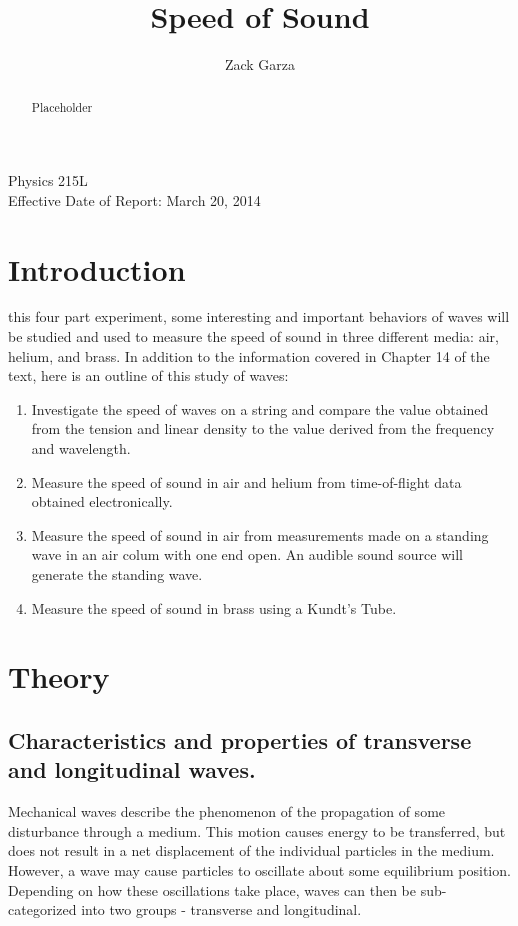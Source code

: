 \documentclass[twocolumn,english]{IEEEtran}
\theoremstyle{plain}
\theoremstyle{plain}
\begin{document}
\title{Speed of Sound}


\author{Zack Garza}


\IEEEspecialpapernotice
{Physics 215L \\
Effective Date of Report: March 20, 2014 }


\maketitle
\begin{abstract}
Placeholder
\end{abstract}
\tableofcontents

\section{Introduction}
 this four part experiment, some interesting and important behaviors of waves will be studied and used to measure the speed of sound in three different media: air, helium, and brass.
In addition to the information covered in Chapter 14 of the text, here is an outline of this study of waves:

\begin{enumerate}
 \item Investigate the speed of waves on a string and compare the value obtained from the tension and linear density to the value derived from the frequency and wavelength.
 \item Measure the speed of sound in air and helium from time-of-flight data obtained electronically.
 \item Measure the speed of sound in air from measurements made on a standing wave in an air colum with one end open.
 An audible sound source will generate the standing wave.
 \item Measure the speed of sound in brass using a Kundt's Tube.
\end{enumerate}

\section{Theory}
\subsection{Characteristics and properties of transverse and longitudinal waves.}

Mechanical waves describe the phenomenon of the propagation of some disturbance through a medium. This motion causes energy to be transferred, but does not result in a net displacement of the individual particles in the medium. However, a wave may cause particles to oscillate about some equilibrium position. Depending on how these oscillations take place, waves can then be sub-categorized into two groups - transverse and longitudinal.
\end{document}

